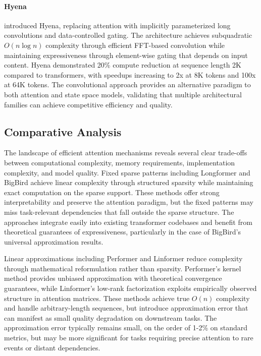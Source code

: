 \documentclass[11pt,letterpaper]{article}
\begin{document}
\paragraph{Hyena}

\cite{poli2023hyena} introduced Hyena, replacing attention with implicitly parameterized long convolutions and data-controlled gating. The architecture achieves subquadratic $O(n \log n)$ complexity through efficient FFT-based convolution while maintaining expressiveness through element-wise gating that depends on input content. Hyena demonstrated 20\% compute reduction at sequence length 2K compared to transformers, with speedups increasing to 2x at 8K tokens and 100x at 64K tokens. The convolutional approach provides an alternative paradigm to both attention and state space models, validating that multiple architectural families can achieve competitive efficiency and quality.

\subsection{Comparative Analysis}

The landscape of efficient attention mechanisms reveals several clear trade-offs between computational complexity, memory requirements, implementation complexity, and model quality. Fixed sparse patterns including Longformer and BigBird achieve linear complexity through structured sparsity while maintaining exact computation on the sparse support. These methods offer strong interpretability and preserve the attention paradigm, but the fixed patterns may miss task-relevant dependencies that fall outside the sparse structure. The approaches integrate easily into existing transformer codebases and benefit from theoretical guarantees of expressiveness, particularly in the case of BigBird's universal approximation results.

Linear approximations including Performer and Linformer reduce complexity through mathematical reformulation rather than sparsity. Performer's kernel method provides unbiased approximation with theoretical convergence guarantees, while Linformer's low-rank factorization exploits empirically observed structure in attention matrices. These methods achieve true $O(n)$ complexity and handle arbitrary-length sequences, but introduce approximation error that can manifest as small quality degradation on downstream tasks. The approximation error typically remains small, on the order of 1-2\% on standard metrics, but may be more significant for tasks requiring precise attention to rare events or distant dependencies.
\end{document}
